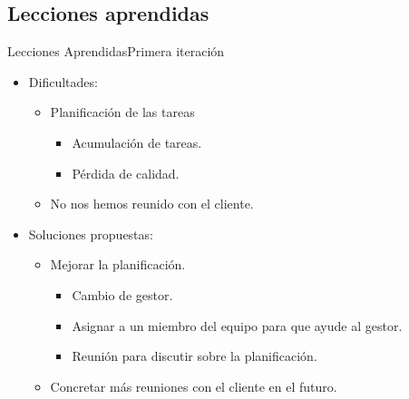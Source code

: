 \documentclass{beamer}
\begin{document}
\subsection{Lecciones aprendidas}
	\begin{frame}{Lecciones Aprendidas}{Primera iteraci\'on}
		\begin{itemize}
			\item {
				Dificultades:
				\begin{itemize}
					\item {
						Planificaci\'on de las tareas
						\begin{itemize}
							\item {
								Acumulaci\'on de tareas.
							}
							\item {
								P\'erdida de calidad.
							}
						\end{itemize}
					}
					\item {
						No nos hemos reunido con el cliente.
					}
				\end{itemize}
			}
			\item {
				\vspace{0.5cm}
				Soluciones propuestas:
				\begin{itemize}
					\item {
						Mejorar la planificaci\'on.
						\begin{itemize}
							\item {
								Cambio de gestor.
							}
							\item {
								Asignar a un miembro del equipo para que ayude al gestor.
							}
							\item {
								Reuni\'on para discutir sobre la planificaci\'on.
							}
						\end{itemize}
					}
					\item {
						Concretar m\'as reuniones con el cliente en el futuro.
					}
				\end{itemize}
			}
		\end{itemize}
	
	  
	\end{frame}
	
\end{document}
